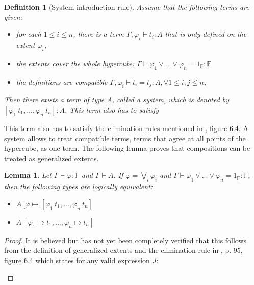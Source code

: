 \documentclass[12pt,a4paper,twoside,xetex]{book} %
\newcommand{\keyword}[1]{\emph{#1}\index{#1}}
\newtheorem{lemma}[theorem]{Lemma}
\newtheorem{definition}[theorem]{Definition}
\begin{document}
\begin{definition}[System introduction rule]
Assume that the following terms are given: 
\begin{itemize}
\item for each $1 \leq i \leq n$, there is a term  $\Gamma, \varphi_i \vdash 
t_i : A$ that is only defined on the extent $\varphi_i$, 
\item the extents cover the whole hypercube: $\Gamma \vdash \varphi_1 \vee ... 
\vee \varphi_n = 1_{\mathbb{F}} : \mathbb{F}$ 
\item the definitions are compatible $\Gamma, \varphi_i \vdash t_i = t_j : A, 
\forall 1\leq i,j\leq n$, 
\end{itemize}
Then there exists a term of type $A$, called a \keyword{system}, which  is denoted 
by $[\varphi_1 \  t_1, ..., \varphi_n \ t_n]: A$. This term also has to satisfy
\end{definition}

This term also has to satisfy the elimination rules mentioned in \cite{Huber2016}, figure 6.4.  A system allows to treat compatible terms, terms that agree at all points of the hypercube, as one term. The following lemma proves that compositions can be treated as generalized extents.



\begin{lemma}\label{extentrewrite}
Let $\Gamma \vdash \varphi : \mathbb{F}$ and $\Gamma \vdash A$. If $\varphi = 
\bigvee_i \varphi_i$ and $\Gamma \vdash \varphi_1 \vee ... \vee \varphi_n = 
1_{\mathbb{F}} : \mathbb{F}$, then the following types are logically equivalent: 
\begin{itemize}
\item $A\ [\varphi \mapsto [\varphi_1 \ t_1, ..., \varphi_n \ t_n]$
\item $A\ [\varphi_1 \mapsto t_1, ..., \varphi_n \mapsto t_n]$
\end{itemize}

\end{lemma}

\begin{proof}
It is believed but has not yet been completely verified that this follows from the definition of generalized extents and the elimination rule in \cite{Huber2016}, p. 95, figure 6.4 which states for any valid expression $J$: 
\begin{prooftree}
\end{prooftree}
\end{proof}
\end{document}
